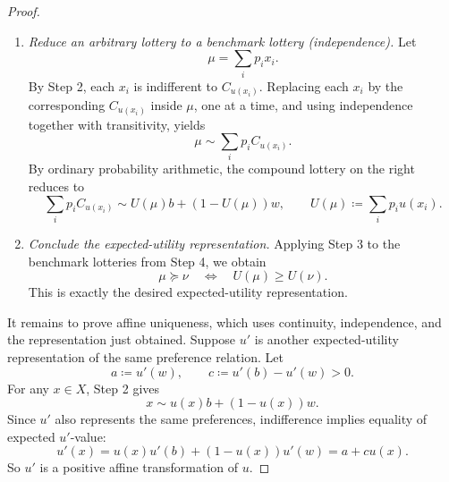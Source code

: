 \documentclass[11pt]{article}
\newcommand{\pref}{\succcurlyeq}
\newcommand{\indiff}{\sim}
\begin{document}
\begin{proof}
\begin{enumerate}[label=\textbf{\arabic*.}, leftmargin=*]
\item \emph{Reduce an arbitrary lottery to a benchmark lottery (independence).}
Let
\[
\mu=\sum_i p_i x_i.
\]
By Step 2, each $x_i$ is indifferent to $C_{u(x_i)}$. Replacing each $x_i$ by
the corresponding $C_{u(x_i)}$ inside $\mu$, one at a time, and using
independence together with transitivity, yields
\[
\mu \indiff \sum_i p_i C_{u(x_i)}.
\]
By ordinary probability arithmetic, the compound lottery on the right reduces
to
\[
\sum_i p_i C_{u(x_i)}
\indiff
U(\mu)b+(1-U(\mu))w,
\qquad
U(\mu)\coloneqq \sum_i p_i u(x_i).
\]

\item \emph{Conclude the expected-utility representation.}
Applying Step 3 to the benchmark lotteries from Step 4, we obtain
\[
\mu\pref\nu
\quad\Longleftrightarrow\quad
U(\mu)\geq U(\nu).
\]
This is exactly the desired expected-utility representation.

\end{enumerate}

It remains to prove affine uniqueness, which uses continuity, independence,
and the representation just obtained. Suppose $u'$ is another
expected-utility representation of the same preference relation. Let
\[
a\coloneqq u'(w),
\qquad
c\coloneqq u'(b)-u'(w)>0.
\]
For any $x\in X$, Step 2 gives
\[
x \indiff u(x)b+(1-u(x))w.
\]
Since $u'$ also represents the same preferences, indifference implies equality
of expected $u'$-value:
\[
u'(x)=u(x)u'(b)+(1-u(x))u'(w)=a+cu(x).
\]
So $u'$ is a positive affine transformation of $u$.

\end{proof}
\end{document}
